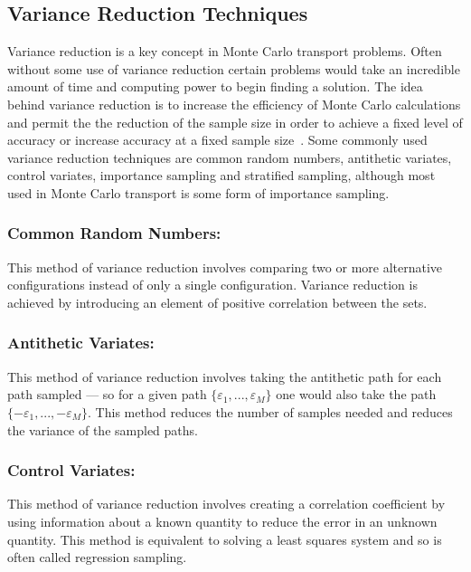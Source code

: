 \subsection{Variance Reduction Techniques}

Variance reduction is a key concept in Monte Carlo transport problems.
%
Often without some use of variance reduction certain problems would take an incredible amount of time and computing power to begin finding a solution.
%
The idea behind variance reduction is to increase the efficiency of Monte Carlo calculations and permit the the reduction of the sample size in order to achieve a fixed level of accuracy or increase accuracy at a fixed sample size~\cite{kahn1953methods}.
%
Some commonly used variance reduction techniques are common random numbers, antithetic variates, control variates, importance sampling and stratified sampling, although most used in Monte Carlo transport is some form of importance sampling.
%

\subsubsection*{Common Random Numbers:} This method of variance reduction involves comparing two or more alternative configurations instead of only a single configuration. Variance reduction is achieved by introducing an element of positive correlation between the sets.~\cite{wikipediaVarReduction}

\subsubsection*{ Antithetic Variates: } This method of variance reduction involves taking the antithetic path for each path sampled --- so for a given path $ \{ \varepsilon_1, ..., \varepsilon_M \}$ one would also take the path $ \{ -\varepsilon_1, ... , -\varepsilon_M  \} $. This method reduces the number of samples needed and reduces the variance of the sampled paths. ~\cite{wikipediaAntitheticVaraites}

\subsubsection*{Control Variates: } This method of variance reduction involves creating a correlation coefficient by using information about a known quantity to reduce the error in an unknown quantity. This method is equivalent to solving a least squares system and so is often called regression sampling. ~\cite{wikipediaControlVaraites}

